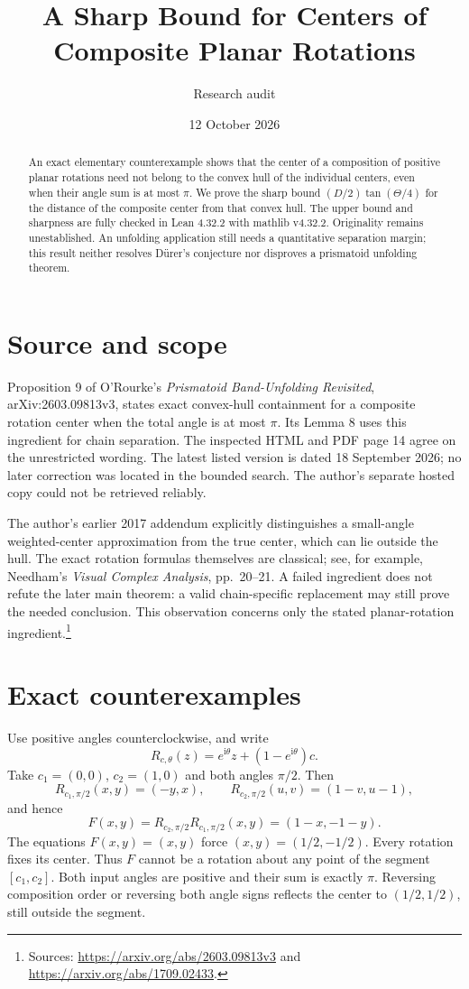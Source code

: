 \documentclass[11pt,letterpaper]{article}
\title{A Sharp Bound for Centers of Composite Planar Rotations}
\author{Research audit}
\date{12 October 2026}
\newcommand{\ii}{\mathrm{i}}
\begin{document}
\maketitle
\begin{abstract}
An exact elementary counterexample shows that the center of a composition of
positive planar rotations need not belong to the convex hull of the individual
centers, even when their angle sum is at most $\pi$. We prove the sharp
bound $(D/2)\tan(\Theta/4)$ for the distance of the composite center from that
convex hull. The upper bound and sharpness are fully checked in Lean 4.32.2
with mathlib v4.32.2. Originality remains unestablished. An unfolding application
still needs a quantitative separation margin; this result neither resolves
D\"urer's conjecture nor disproves a prismatoid unfolding theorem.
\end{abstract}

\section{Source and scope}
Proposition 9 of O'Rourke's \emph{Prismatoid Band-Unfolding Revisited},
arXiv:2603.09813v3, states exact convex-hull containment for a composite
rotation center when the total angle is at most $\pi$. Its Lemma 8 uses this
ingredient for chain separation. The inspected HTML and PDF page 14 agree on
the unrestricted wording. The latest listed version is dated 18 September
2026; no later correction was located in the bounded search. The author's
separate hosted copy could not be retrieved reliably.

The author's earlier 2017 addendum explicitly distinguishes a small-angle
weighted-center approximation from the true center, which can lie outside
the hull. The exact rotation formulas themselves are classical; see, for
example, Needham's \emph{Visual Complex Analysis}, pp.~20--21. A failed
ingredient does not refute the later main theorem: a valid chain-specific
replacement may still prove the needed conclusion. This observation concerns only the stated
planar-rotation ingredient.\footnote{Sources:
\url{https://arxiv.org/abs/2603.09813v3} and
\url{https://arxiv.org/abs/1709.02433}.}

\section{Exact counterexamples}
Use positive angles counterclockwise, and write
\[
 R_{c,\theta}(z)=e^{\ii\theta}z+(1-e^{\ii\theta})c.
\]
Take $c_1=(0,0)$, $c_2=(1,0)$ and both angles $\pi/2$. Then
\[
 R_{c_1,\pi/2}(x,y)=(-y,x),\qquad
 R_{c_2,\pi/2}(u,v)=(1-v,u-1),
\]
and hence
\[
 F(x,y)=R_{c_2,\pi/2}R_{c_1,\pi/2}(x,y)=(1-x,-1-y).
\]
The equations $F(x,y)=(x,y)$ force $(x,y)=(1/2,-1/2)$. Every rotation
fixes its center. Thus $F$ cannot be a rotation about any point of the segment
$[c_1,c_2]$. Both input angles are positive and their sum is exactly $\pi$.
Reversing composition order or reversing both angle signs reflects the center
to $(1/2,1/2)$, still outside the segment.
\end{document}
